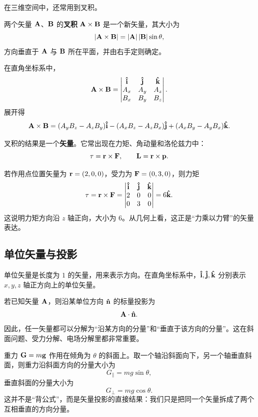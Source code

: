在三维空间中，还常用到叉积。

\begin{definition}
两个矢量 $\vb{A}$、$\vb{B}$ 的\textbf{叉积} $\vb{A}\times\vb{B}$ 是一个新矢量，其大小为
\[
  \left|\vb{A}\times\vb{B}\right| = \left|\vb{A}\right|\left|\vb{B}\right|\sin\theta,
\]
方向垂直于 $\vb{A}$ 与 $\vb{B}$ 所在平面，并由右手定则确定。
\end{definition}

在直角坐标系中，
\[
  \vb{A}\times\vb{B}=
  \begin{vmatrix}
    \vu{i} & \vu{j} & \vu{k} \\
    A_x & A_y & A_z \\
    B_x & B_y & B_z
  \end{vmatrix}.
\]
展开得
\[
  \vb{A}\times\vb{B} =
  (A_yB_z-A_zB_y)\vu{i}
  -(A_xB_z-A_zB_x)\vu{j}
  +(A_xB_y-A_yB_x)\vu{k}.
\]

叉积的结果是一个\textbf{矢量}。它常出现在力矩、角动量和洛伦兹力中：
\[
  \vb{\tau}=\vb{r}\times\vb{F}, \qquad \vb{L}=\vb{r}\times\vb{p}.
\]

\begin{example}
若作用点位置矢量为 $\vb{r}=(2,0,0)$，受力为 $\vb{F}=(0,3,0)$，则力矩
\[
  \vb{\tau}=\vb{r}\times\vb{F}
  =
  \begin{vmatrix}
    \vu{i} & \vu{j} & \vu{k} \\
    2 & 0 & 0 \\
    0 & 3 & 0
  \end{vmatrix}
  = 6\vu{k}.
\]
这说明力矩方向沿 $z$ 轴正向，大小为 $6$。从几何上看，这正是“力乘以力臂”的矢量表达。
\end{example}

\subsection{单位矢量与投影}

单位矢量是长度为 $1$ 的矢量，用来表示方向。在直角坐标系中，$\vu{i},\vu{j},\vu{k}$ 分别表示 $x,y,z$ 轴正方向上的单位矢量。

若已知矢量 $\vb{A}$，则沿某单位方向 $\vu{n}$ 的标量投影为
\[
  \vb{A}\cdot\vu{n}.
\]
因此，任一矢量都可以分解为“沿某方向的分量”和“垂直于该方向的分量”。这在斜面问题、受力分解、电场分解里都非常重要。

\begin{example}
重力 $\vb{G}=m\vb{g}$ 作用在倾角为 $\theta$ 的斜面上。取一个轴沿斜面向下，另一个轴垂直斜面，则重力沿斜面方向的分量大小为
\[
  G_{\parallel}=mg\sin\theta,
\]
垂直斜面的分量大小为
\[
  G_{\perp}=mg\cos\theta.
\]
这并不是“背公式”，而是矢量投影的直接结果：我们只是把同一个矢量拆成了两个互相垂直的方向分量。
\end{example}

